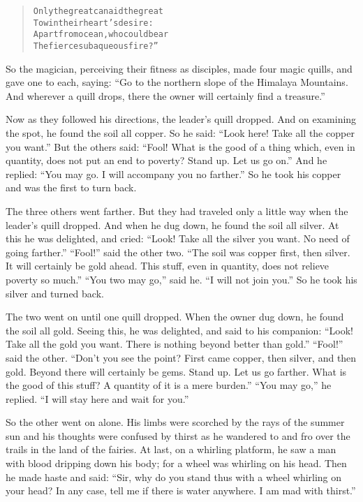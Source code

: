 \documentclass[article, twoside, 14pt]{memoir}
\renewenvironment{verbatim}{%
\begin{quote}%
\vskip -10pt%
\begin{alltt}\normalfont\large}{\end{alltt}%
\end{quote}%
\vskip -10pt
} %
\begin{document}
\begin{verbatim}
Only the great can aid the great
    To win their heart's desire:
Apart from ocean, who could bear
    The fierce subaqueous fire?”
\end{verbatim}
So the magician, perceiving their fitness as disciples, made four
magic quills, and gave one to each, saying:
``Go to the northern slope of the Himalaya Mountains. And wherever a quill drops, there the owner will certainly find a treasure.''

Now as they followed his directions, the leader's quill dropped.
And on examining the spot, he found the soil all copper. So he
said: ``Look here! Take all the copper you want.'' But the others
said:
``Fool! What is the good of a thing which, even in quantity, does not put an end to poverty? Stand up. Let us go on.''
And he replied: ``You may go. I will accompany you no farther.'' So
he took his copper and was the first to turn back.

The three others went farther. But they had traveled only a little
way when the leader's quill dropped. And when he dug down, he found
the soil all silver. At this he was delighted, and cried:
``Look! Take all the silver you want. No need of going farther.''
``Fool!'' said the other two.
``The soil was copper first, then silver. It will certainly be gold ahead. This stuff, even in quantity, does not relieve poverty so much.''
``You two may go,'' said he. ``I will not join you.'' So he took
his silver and turned back.

The two went on until one quill dropped. When the owner dug down,
he found the soil all gold. Seeing this, he was delighted, and said
to his companion:
``Look! Take all the gold you want. There is nothing beyond better than gold.''
``Fool!'' said the other.
``Don't you see the point? First came copper, then silver, and then gold. Beyond there will certainly be gems. Stand up. Let us go farther. What is the good of this stuff? A quantity of it is a mere burden.''
``You may go,'' he replied. ``I will stay here and wait for you.''

So the other went on alone. His limbs were scorched by the rays of
the summer sun and his thoughts were confused by thirst as he
wandered to and fro over the trails in the land of the fairies. At
last, on a whirling platform, he saw a man with blood dripping down
his body; for a wheel was whirling on his head. Then he made haste
and said:
``Sir, why do you stand thus with a wheel whirling on your head? In any case, tell me if there is water anywhere. I am mad with thirst.''
\end{document}
